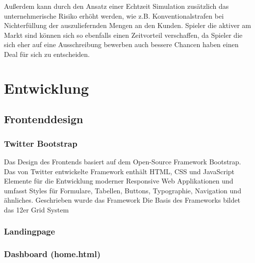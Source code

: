 \par Außerdem kann durch den Ansatz einer Echtzeit Simulation zusätzlich das unternehmerische Risiko erhöht werden, wie z.B. Konventionalstrafen bei Nichterfüllung der auszuliefernden Mengen an den Kunden. Spieler die aktiver am Markt sind können sich so ebenfalls einen Zeitvorteil verschaffen, da Spieler die sich eher auf eine Ausschreibung bewerben auch bessere Chancen haben einen Deal für sich zu entscheiden.
\chapter{Entwicklung}
\section{Frontenddesign}
\subsection{Twitter Bootstrap}
Das Design des Frontends basiert auf dem Open-Source Framework Bootstrap. Das von Twitter entwickelte Framework enthält HTML, CSS und JavaScript Elemente für die Entwicklung moderner Responsive Web Applikationen und umfasst Styles für Formulare, Tabellen, Buttons, Typographie, Navigation und ähnliches. Geschrieben wurde das Framework  Die Basis des Frameworks bildet das 12er Grid System
\subsection{Landingpage}
\subsection{Dashboard (home.html)}





